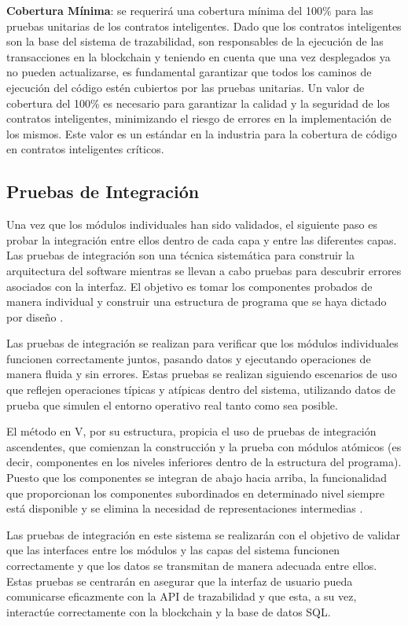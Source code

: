 \documentclass[main.tex]{subfiles}
\begin{document}
\textbf{Cobertura Mínima}: se requerirá una cobertura mínima del 100\% para las pruebas unitarias de los contratos inteligentes. Dado que los contratos inteligentes son la base del sistema de trazabilidad, son responsables de la ejecución de las transacciones en la blockchain y teniendo en cuenta que una vez desplegados ya no pueden actualizarse, es fundamental garantizar que todos los caminos de ejecución del código estén cubiertos por las pruebas unitarias. Un valor de cobertura del 100\% es necesario para garantizar la calidad y la seguridad de los contratos inteligentes, minimizando el riesgo de errores en la implementación de los mismos. Este valor es un estándar en la industria para la cobertura de código en contratos inteligentes críticos.

\subsection{Pruebas de Integración}

Una vez que los módulos individuales han sido validados, el siguiente paso es probar la integración entre ellos dentro de cada capa y entre las diferentes capas. Las pruebas de integración son una técnica sistemática para construir la arquitectura del software mientras se llevan a cabo pruebas para descubrir errores asociados con la interfaz. El objetivo es tomar los componentes probados de manera individual y construir una estructura de
programa que se haya dictado por diseño \cite{pressman2010ingeneria}.

Las pruebas de integración se realizan para verificar que los módulos individuales funcionen correctamente juntos, pasando datos y ejecutando operaciones de manera fluida y sin errores. Estas pruebas se realizan siguiendo escenarios de uso que reflejen operaciones típicas y atípicas dentro del sistema, utilizando datos de prueba que simulen el entorno operativo real tanto como sea posible.

El método en V, por su estructura, propicia el uso de pruebas de integración ascendentes, que comienzan la construcción y la prueba con módulos atómicos (es decir, componentes en los niveles inferiores dentro de la estructura del programa). Puesto que los componentes se integran de abajo hacia arriba, la funcionalidad que proporcionan los componentes subordinados en determinado nivel siempre está disponible y se elimina la necesidad de representaciones intermedias \cite{pressman2010ingeneria}.

Las pruebas de integración en este sistema se realizarán con el objetivo de validar que las interfaces entre los módulos y las capas del sistema funcionen correctamente y que los datos se transmitan de manera adecuada entre ellos. Estas pruebas se centrarán en asegurar que la interfaz de usuario pueda comunicarse eficazmente con la API de trazabilidad y que esta, a su vez, interactúe correctamente con la blockchain y la base de datos SQL. 
\end{document}
